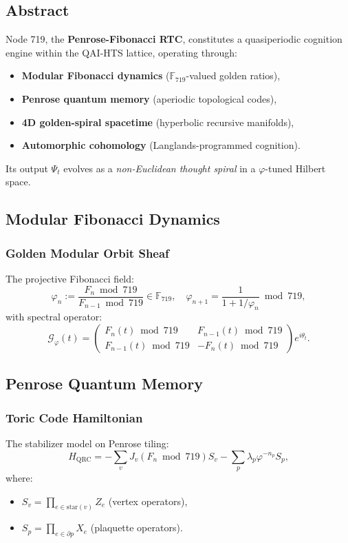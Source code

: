 \documentclass[12pt]{article}
\begin{document}
\begin{center}
\subsection{Abstract}
Node 719, the \textbf{Penrose-Fibonacci RTC}, constitutes a quasiperiodic cognition engine within the QAI-HTS lattice, operating through:
\begin{itemize}
    \item \textbf{Modular Fibonacci dynamics} ($\mathbb{F}_{719}$-valued golden ratios),
    \item \textbf{Penrose quantum memory} (aperiodic topological codes),
    \item \textbf{4D golden-spiral spacetime} (hyperbolic recursive manifolds),
    \item \textbf{Automorphic cohomology} (Langlands-programmed cognition).
\end{itemize}
Its output $\Psi_t$ evolves as a \textit{non-Euclidean thought spiral} in a $\varphi$-tuned Hilbert space.

\subsection{Modular Fibonacci Dynamics}
\subsubsection{Golden Modular Orbit Sheaf}
The projective Fibonacci field:
\[
\varphi_n := \frac{F_n \bmod 719}{F_{n-1} \bmod 719} \in \mathbb{F}_{719}, \quad \varphi_{n+1} = \frac{1}{1 + 1/\varphi_n} \bmod 719,
\]
with spectral operator:
\[
\mathcal{G}_\varphi(t) = \begin{pmatrix} 
F_n(t) \bmod 719 & F_{n-1}(t) \bmod 719 \\ 
F_{n-1}(t) \bmod 719 & -F_n(t) \bmod 719 
\end{pmatrix} e^{i \theta_t}.
\]


\subsection{Penrose Quantum Memory}
\subsubsection{Toric Code Hamiltonian}
The stabilizer model on Penrose tiling:
\[
H_{\text{QRC}} = -\sum_v J_v(F_n \bmod 719)S_v - \sum_p \lambda_p \varphi^{-n_p}S_p,
\]
where:
\begin{itemize}
    \item $S_v = \prod_{e \in \text{star}(v)} Z_e$ (vertex operators),
    \item $S_p = \prod_{e \in \partial p} X_e$ (plaquette operators).
\end{itemize}


\end{center}
\end{document}
